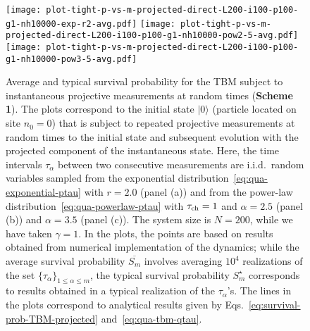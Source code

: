 \documentclass[12pt]{iopart}
\def\ra{\rangle}
\begin{document}
\begin{figure}[!htbp]
\centering
\texttt{[image: plot-tight-p-vs-m-projected-direct-L200-i100-p100-g1-nh10000-exp-r2-avg.pdf]}
\texttt{[image: plot-tight-p-vs-m-projected-direct-L200-i100-p100-g1-nh10000-pow2-5-avg.pdf]} 
\texttt{[image: plot-tight-p-vs-m-projected-direct-L200-i100-p100-g1-nh10000-pow3-5-avg.pdf]}
\caption{Average and typical survival probability for the TBM subject to instantaneous projective measurements at random times
(\textbf{Scheme 1}). The plots correspond to the initial state $|0\ra$
        (particle located on site $n_0=0$) that is subject to repeated projective
measurements at random times to the initial state and subsequent evolution with the
projected component of the instantaneous state. Here, the time intervals $\tau_\alpha$ between two consecutive
measurements are i.i.d.~random variables sampled from the exponential
distribution~\eqref{eq:qua-exponential-ptau} with $r=2.0$ (panel (a)) and
from the power-law distribution~\eqref{eq:qua-powerlaw-ptau} with $\tau_{\rm ch} = 1$ and
$\alpha=2.5$ (panel (b)) and $\alpha=3.5$ (panel (c)). The system size
        is $N=200$, while we have taken $\gamma=1$. In the plots, the points are based on results
        obtained from numerical implementation of the dynamics; while
        the average survival probability $\overline{S_m}$ involves
        averaging $10^4$ realizations of the set $\{\tau_\alpha\}_{1\le
        \alpha \le m}$, the typical survival probability $S_m^\star$
        corresponds to results obtained in a typical realization of the
        $\tau_\alpha$'s. The lines in the plots correspond to analytical
        results given by
        Eqs.~\eqref{eq:survival-prob-TBM-projected} and~\eqref{eq:qua-tbm-qtau}.}
\label{fig:qua-tbm-proj}
\end{figure}
\end{document}
